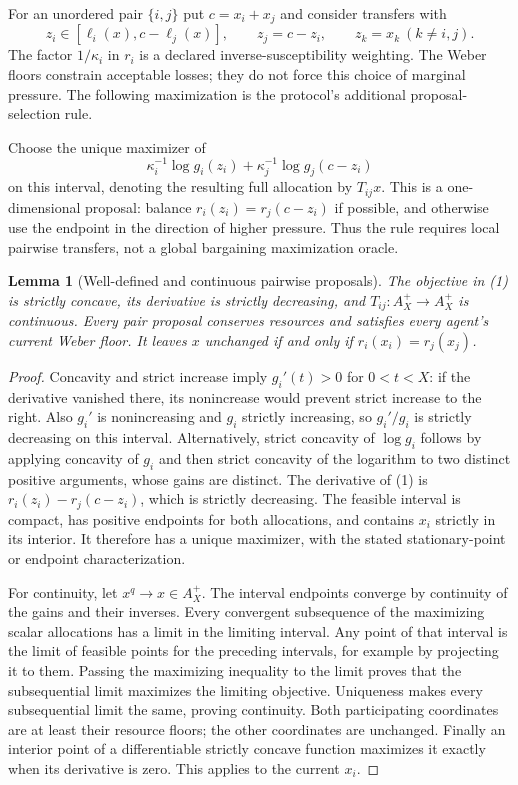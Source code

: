 \documentclass[11pt]{article}
\newtheorem{lemma}[theorem]{Lemma}
\theoremstyle{remark}\newtheorem{remark}[theorem]{Remark}
\begin{document}
For an unordered pair $\{i,j\}$ put $c=x_i+x_j$ and consider transfers with
\[
 z_i\in[\ell_i(x),c-\ell_j(x)],\qquad z_j=c-z_i,
 \qquad z_k=x_k\ (k\ne i,j).
\]
The factor $1/\kappa_i$ in $r_i$ is a declared inverse-susceptibility weighting. The Weber floors constrain acceptable losses; they do not force this choice of marginal pressure. The following maximization is the protocol's additional proposal-selection rule.

Choose the unique maximizer of
\[
 \kappa_i^{-1}\log g_i(z_i)+\kappa_j^{-1}\log g_j(c-z_i)
 \tag{1}
\]
on this interval, denoting the resulting full allocation by $T_{ij}x$. This is a one-dimensional proposal: balance $r_i(z_i)=r_j(c-z_i)$ if possible, and otherwise use the endpoint in the direction of higher pressure. Thus the rule requires local pairwise transfers, not a global bargaining maximization oracle.

\begin{lemma}[Well-defined and continuous pairwise proposals]
The objective in (1) is strictly concave, its derivative is strictly decreasing, and $T_{ij}:A_X^+\to A_X^+$ is continuous. Every pair proposal conserves resources and satisfies every agent's current Weber floor. It leaves $x$ unchanged if and only if $r_i(x_i)=r_j(x_j)$.
\end{lemma}
\begin{proof}
Concavity and strict increase imply $g_i'(t)>0$ for $0<t<X$: if the derivative vanished there, its nonincrease would prevent strict increase to the right. Also $g_i'$ is nonincreasing and $g_i$ strictly increasing, so $g_i'/g_i$ is strictly decreasing on this interval. Alternatively, strict concavity of $\log g_i$ follows by applying concavity of $g_i$ and then strict concavity of the logarithm to two distinct positive arguments, whose gains are distinct. The derivative of (1) is $r_i(z_i)-r_j(c-z_i)$, which is strictly decreasing. The feasible interval is compact, has positive endpoints for both allocations, and contains $x_i$ strictly in its interior. It therefore has a unique maximizer, with the stated stationary-point or endpoint characterization.

For continuity, let $x^q\to x\in A_X^+$. The interval endpoints converge by continuity of the gains and their inverses. Every convergent subsequence of the maximizing scalar allocations has a limit in the limiting interval. Any point of that interval is the limit of feasible points for the preceding intervals, for example by projecting it to them. Passing the maximizing inequality to the limit proves that the subsequential limit maximizes the limiting objective. Uniqueness makes every subsequential limit the same, proving continuity. Both participating coordinates are at least their resource floors; the other coordinates are unchanged. Finally an interior point of a differentiable strictly concave function maximizes it exactly when its derivative is zero. This applies to the current $x_i$.
\end{proof}
\end{document}
